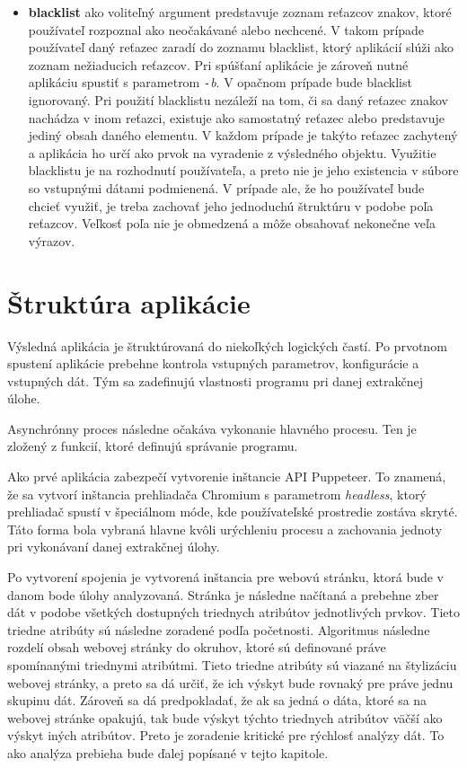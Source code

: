 \begin{itemize}
  \item \textbf{blacklist} ako voliteľný argument predstavuje zoznam reťazcov znakov, ktoré používateľ rozpoznal ako neočakávané alebo nechcené. V takom prípade používateľ daný reťazec zaradí do zoznamu blacklist, ktorý aplikácií slúži ako zoznam nežiaducich reťazcov. Pri spúšťaní aplikácie je zároveň nutné aplikáciu spustiť s parametrom \textit{\texttt{-}b}. V opačnom prípade bude blacklist ignorovaný. Pri použití blacklistu nezáleží na tom, či sa daný reťazec znakov nachádza v inom reťazci, existuje ako samostatný reťazec alebo predstavuje jediný obsah daného elementu. V každom prípade je takýto reťazec zachytený a aplikácia ho určí ako prvok na vyradenie z výsledného objektu. Využitie blacklistu je na rozhodnutí používateľa, a preto nie je jeho existencia v súbore so vstupnými dátami podmienená. V prípade ale, že ho používateľ bude chcieť využiť, je treba zachovať jeho jednoduchú štruktúru v podobe poľa reťazcov. Veľkosť poľa nie je obmedzená a môže obsahovať nekonečne veľa výrazov. 
 \end{itemize}
 
 \section{Štruktúra aplikácie}
 
 Výsledná aplikácia je štruktúrovaná do niekoľkých logických častí. Po prvotnom spustení aplikácie prebehne kontrola vstupných parametrov, konfigurácie a vstupných dát. Tým sa zadefinujú vlastnosti programu pri danej extrakčnej úlohe.
 
 Asynchrónny proces následne očakáva vykonanie hlavného procesu. Ten je zložený z funkcií, ktoré definujú správanie programu. 
 
 Ako prvé aplikácia zabezpečí vytvorenie inštancie API Puppeteer. To znamená, že sa vytvorí inštancia prehliadača Chromium s parametrom \textit{headless}, ktorý prehliadač spustí v špeciálnom móde, kde používateľské prostredie zostáva skryté. Táto forma bola vybraná hlavne kvôli urýchleniu procesu a zachovania jednoty pri vykonávaní danej extrakčnej úlohy. 
 
 Po vytvorení spojenia je vytvorená inštancia pre webovú stránku, ktorá bude v danom bode úlohy analyzovaná. Stránka je následne načítaná a prebehne zber dát v podobe všetkých dostupných triednych atribútov jednotlivých prvkov. Tieto triedne atribúty sú následne zoradené podľa početnosti. Algoritmus následne rozdelí obsah webovej stránky do okruhov, ktoré sú definované práve spomínanými triednymi atribútmi. Tieto triedne atribúty sú viazané na štylizáciu webovej stránky, a preto sa dá určiť, že ich výskyt bude rovnaký pre práve jednu skupinu dát. Zároveň sa dá predpokladať, že ak sa jedná o dáta, ktoré sa na webovej stránke opakujú, tak bude výskyt týchto triednych atribútov väčší ako výskyt iných atribútov. Preto je zoradenie kritické pre rýchlosť analýzy dát. To ako analýza prebieha bude ďalej popísané v tejto kapitole.
 

